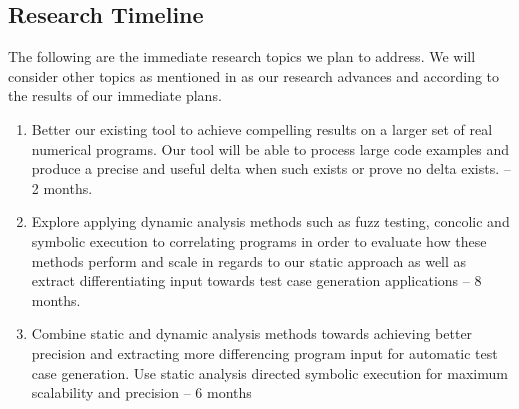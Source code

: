 
\subsection{Research Timeline}
The following are the immediate research topics we plan to address. We will consider other topics as mentioned in  as our research advances and according to the results of our immediate plans.

\begin{enumerate}
\item Better our existing tool to achieve compelling results on a larger set of real numerical programs. Our tool will be able to process large code examples and produce a precise and useful delta when such exists or prove no delta exists. -- 2 months.
\item Explore applying dynamic analysis methods such as fuzz testing, concolic and symbolic execution to correlating programs in order to evaluate how these methods perform and scale in regards to our static approach as well as extract differentiating input towards test case generation applications -- 8 months.   
\item Combine static and dynamic analysis methods towards achieving better precision and extracting more differencing program input for automatic test case generation. Use static analysis directed symbolic execution for maximum scalability and precision -- 6 months
\end{enumerate} 